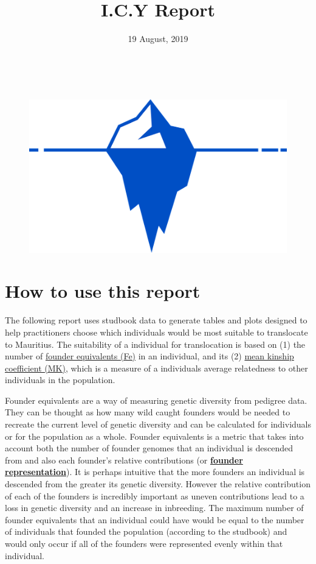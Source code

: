\documentclass[12pt,]{article}
\title{I.C.Y Report}
\author{}
\date{19 August, 2019}
\begin{document}
\maketitle

~ ~ ~ ~

\vspace{4cm}

\begin{figure}[H]

\includegraphics[width=\linewidth]{../Images/logo.png}
 
\end{figure}

\clearpage

\section{\textbf{How to use this report}}

The following report uses studbook data to generate tables and plots
designed to help practitioners choose which individuals would be most
suitable to translocate to Mauritius. The suitability of a individual
for translocation is based on (1) the number of
\hyperlink{term0}{founder equivalents (Fe)} in an individual, and its
(2) \hyperlink{term2}{mean kinship coefficient (MK)}, which is a measure
of a individuals average relatedness to other individuals in the
population.

Founder equivalents are a way of measuring genetic diversity from
pedigree data. They can be thought as how many wild caught founders
would be needed to recreate the current level of genetic diversity and
can be calculated for individuals or for the population as a whole.
Founder equivalents is a metric that takes into account both the number
of founder genomes that an individual is descended from and also each
founder's relative contributions (or
\hyperlink{term1}{\textbf{founder representation}}). It is perhaps
intuitive that the more founders an individual is descended from the
greater its genetic diversity. However the relative contribution of each
of the founders is incredibly important as uneven contributions lead to
a loss in genetic diversity and an increase in inbreeding. The maximum
number of founder equivalents that an individual could have would be
equal to the number of individuals that founded the population
(according to the studbook) and would only occur if all of the founders
were represented evenly within that individual.
\end{document}
